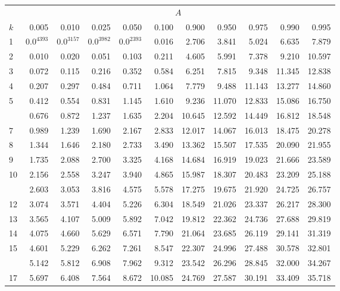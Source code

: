 \documentclass[]{article}
\begin{document}
\begin{table}[H]
\centering
\begin{tabular}{lrrrrrrrrrr}
\toprule
\multicolumn{1}{c}{ } & \multicolumn{10}{c}{$A$} \\
\cmidrule(l{3pt}r{3pt}){2-11}
$k$ & 0.005 & 0.010 & 0.025 & 0.050 & 0.100 & 0.900 & 0.950 & 0.975 & 0.990 & 0.995\\
\midrule
1 & $0.0^4393$ & $0.0^3157$ & $0.0^3982$ & $0.0^2393$ & 0.016 & 2.706 & 3.841 & 5.024 & 6.635 & 7.879\\
2 & 0.010 & 0.020 & 0.051 & 0.103 & 0.211 & 4.605 & 5.991 & 7.378 & 9.210 & 10.597\\
3 & 0.072 & 0.115 & 0.216 & 0.352 & 0.584 & 6.251 & 7.815 & 9.348 & 11.345 & 12.838\\
4 & 0.207 & 0.297 & 0.484 & 0.711 & 1.064 & 7.779 & 9.488 & 11.143 & 13.277 & 14.860\\
5 & 0.412 & 0.554 & 0.831 & 1.145 & 1.610 & 9.236 & 11.070 & 12.833 & 15.086 & 16.750\\
\addlinespace
6 & 0.676 & 0.872 & 1.237 & 1.635 & 2.204 & 10.645 & 12.592 & 14.449 & 16.812 & 18.548\\
7 & 0.989 & 1.239 & 1.690 & 2.167 & 2.833 & 12.017 & 14.067 & 16.013 & 18.475 & 20.278\\
8 & 1.344 & 1.646 & 2.180 & 2.733 & 3.490 & 13.362 & 15.507 & 17.535 & 20.090 & 21.955\\
9 & 1.735 & 2.088 & 2.700 & 3.325 & 4.168 & 14.684 & 16.919 & 19.023 & 21.666 & 23.589\\
10 & 2.156 & 2.558 & 3.247 & 3.940 & 4.865 & 15.987 & 18.307 & 20.483 & 23.209 & 25.188\\
\addlinespace
11 & 2.603 & 3.053 & 3.816 & 4.575 & 5.578 & 17.275 & 19.675 & 21.920 & 24.725 & 26.757\\
12 & 3.074 & 3.571 & 4.404 & 5.226 & 6.304 & 18.549 & 21.026 & 23.337 & 26.217 & 28.300\\
13 & 3.565 & 4.107 & 5.009 & 5.892 & 7.042 & 19.812 & 22.362 & 24.736 & 27.688 & 29.819\\
14 & 4.075 & 4.660 & 5.629 & 6.571 & 7.790 & 21.064 & 23.685 & 26.119 & 29.141 & 31.319\\
15 & 4.601 & 5.229 & 6.262 & 7.261 & 8.547 & 22.307 & 24.996 & 27.488 & 30.578 & 32.801\\
\addlinespace
16 & 5.142 & 5.812 & 6.908 & 7.962 & 9.312 & 23.542 & 26.296 & 28.845 & 32.000 & 34.267\\
17 & 5.697 & 6.408 & 7.564 & 8.672 & 10.085 & 24.769 & 27.587 & 30.191 & 33.409 & 35.718\\

\end{tabular}
\end{table}
\end{document}
